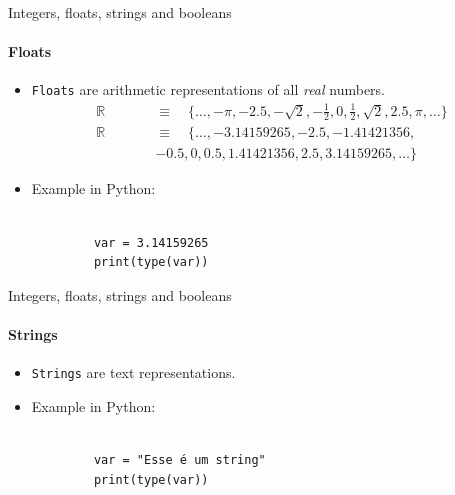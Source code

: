 \documentclass[notes,11pt, aspectratio=169, xcolor=table]{beamer}
\begin{document}
    \begin{frame}[fragile=singleslide]{Integers, floats, strings and booleans}
    \framesubtitle{Floats}

        \begin{itemize}
            \item \texttt{Floats} are arithmetic representations of all \textit{real} numbers.
            \begin{eqnarray}
                \mathbb{R} &\quad& \equiv \quad \{ \hdots, -\pi, -2.5, -\sqrt{2}, -\frac{1}{2}, 0, \frac{1}{2}, \sqrt{2}, 2.5, \pi, \hdots \} \\ \nonumber
                \mathbb{R} &\quad& \equiv \quad \{ \hdots, -3.14159265, -2.5, -1.41421356, \\ \nonumber
                &\qquad& -0.5, 0, 0.5, 1.41421356, 2.5, 3.14159265, \hdots \}
            \end{eqnarray}
            \item Example in Python:
        \end{itemize}

        \begin{verbatim}
        
            var = 3.14159265
            print(type(var))
        \end{verbatim}    
   

    \end{frame}    

    \begin{frame}[fragile=singleslide]{Integers, floats, strings and booleans}
    \framesubtitle{Strings}

        \begin{itemize}
            \item \texttt{Strings} are text representations.
            \item Example in Python:
        \end{itemize}

        \begin{verbatim}
        
            var = "Esse é um string"
            print(type(var))
        \end{verbatim}    
   

    \end{frame}    
\end{document}
